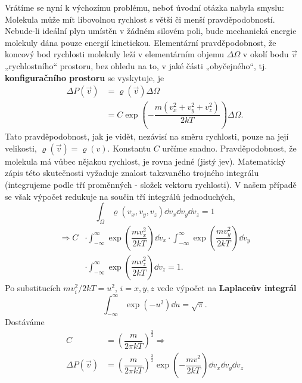 \begin{mdframed}[style=mdexam]
\begin{example}
    Vrátíme se nyní k výchozímu problému, neboť úvodní otázka nabyla smyslu: Molekula může mít
    libovolnou rychlost s větší či menší pravděpodobností. Nebude-li ideální plyn umístěn v žádném
    silovém poli, bude mechanická energie molekuly dána pouze energií kinetickou. Elementární
    pravděpodobnost, že koncový bod rychlosti molekuly leží v elementárním objemu \(\Delta\Omega\) v
    okolí bodu \(\vec{v}\) „rychlostního“ prostoru, bez ohledu na to, v jaké části „obyčejného“, tj.
    \textbf{konfiguračního prostoru} se vyskytuje, je
    \begin{align*}
      \Delta P(\vec{v}) &= \varrho(\vec{v})\Delta\Omega                                          \\
                        &= C\exp\left(-\dfrac{m(v_x^2 + v_y^2 + v_z^2)}{2kT}\right)\Delta\Omega.
    \end{align*}
    Tato pravděpodobnost, jak je vidět, nezávisí na směru rychlosti, pouze na její velikosti,
    \(\varrho(\vec{v}) = \varrho(v)\). Konstantu \(C\) určíme snadno. Pravděpodobnost, že molekula
    má vůbec nějakou rychlost, je rovna jedné (jistý jev). Matematický zápis této skutečnosti
    vyžaduje znalost takzvaného trojného integrálu (integrujeme podle tří proměnných  - složek
    vektoru rychlosti). V našem případě se však výpočet redukuje na součin tří integrálů
    jednoduchých,
    \begin{equation*}
      \int_{\Omega}\varrho(v_x, v_y, v_z)\dd{v_x}\dd{v_y}\dd{v_z} = 1
    \end{equation*}
    \begin{align*}
      \Rightarrow C &\cdot
                      \int_{-\infty}^{\infty}\exp\left(\dfrac{mv_x^2}{2kT}\right)\dd{v_x} 
                 \cdot\int_{-\infty}^{\infty}\exp\left(\dfrac{mv_y^2}{2kT}\right)\dd{v_y}   \\
                &\cdot\int_{-\infty}^{\infty}\exp\left(\dfrac{mv_z^2}{2kT}\right)\dd{v_z} =1.
    \end{align*}
    Po substitucích \(mv_i^2/2kT = u^2,\, i = x, y, z\) vede výpočet na
    \textbf{Laplaceův integrál}
    \begin{equation*}
      \int_{-\infty}^{\infty}\exp(-u^2)\dd{u} = \sqrt{\pi}.
    \end{equation*}
    Dostáváme
    \begin{align*}
      C &= \left(\dfrac{m}{2\pi kT}\right)^{\frac{3}{2}} \Rightarrow  \\
      \Delta P(\vec{v}) &= \left(\dfrac{m}{2\pi kT}\right)^{\frac{3}{2}}
                           \exp\left(- \dfrac{mv^2}{2 kT}\right)\dd{v_x}\dd{v_y}\dd{v_z}

\end{align*}
\end{example}
\end{mdframed}
